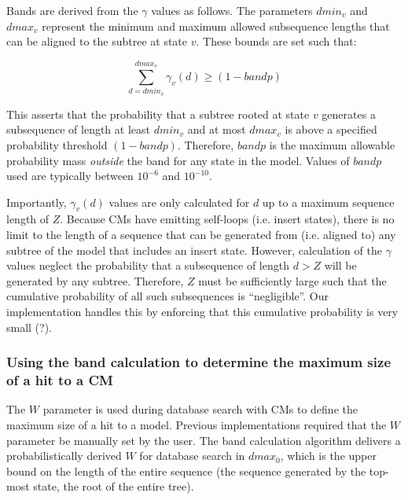 \documentclass[11pt]{article}
\begin{document}
Bands are derived from the $\gamma$ values as follows.
The parameters $dmin_v$ and $dmax_v$ represent the minimum and maximum
allowed subsequence lengths that can be aligned to the subtree
at state $v$. These bounds are set such that: 

\[
\sum_{d = dmin_v}^{dmax_v} \gamma_v(d) \geq (1-bandp)
\]

This asserts that the probability that a subtree
rooted at state $v$ generates a subsequence of length at least
$dmin_v$ and at most $dmax_v$ is above a specified probability
threshold $(1-bandp)$. Therefore, $bandp$ is the maximum allowable
probability mass \emph{outside} the band for any state in the
model. Values of $bandp$ used are typically between $10^{-6}$ and
$10^{-10}$. 

Importantly, $\gamma_v(d)$ values are only calculated for $d$ up to a
maximum sequence length of $Z$. Because CMs have emitting self-loops
(i.e. insert states), there is no limit to the length of a sequence
that can be generated from (i.e. aligned to) any subtree of the model
that includes an insert state. However, calculation of the
$\gamma$ values neglect the probability that a subsequence
of length $d > Z$ will be generated by any subtree.
Therefore, $Z$ must be sufficiently large such that the cumulative
probability of all such subsequences is ``negligible''. Our
implementation handles this by enforcing that this cumulative
probability is very small (?).

\subsubsection{Using the band calculation to determine the maximum
  size of a hit to a CM}
The $W$ parameter is used during database search with CMs to
define the maximum size of a hit to a model. Previous implementations
required that the $W$ parameter be manually set by the user. 
The band calculation algorithm delivers a probabilistically derived
$W$ for database search in $dmax_0$, which is the upper bound on the
length of the entire sequence (the sequence generated by the top-most
state, the root of the entire tree). 
\end{document}
